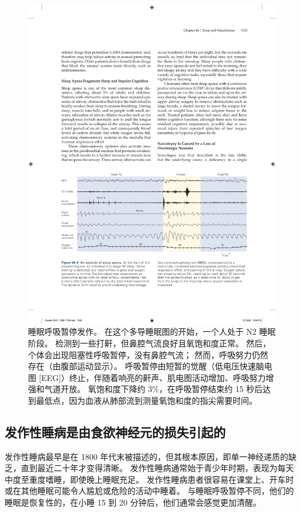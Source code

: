 \begin{figure}[htbp]
	\centering
	\includegraphics[width=0.85\linewidth]{chap44/fig_44_8}
	\caption{睡眠呼吸暂停发作。 在这个多导睡眠图的开始，一个人处于 N2 睡眠阶段。 检测到一些打鼾，但鼻腔气流良好且氧饱和度正常。 然后，个体会出现阻塞性呼吸暂停，没有鼻腔气流； 然而，呼吸努力仍然存在（由腹部运动显示）。 呼吸暂停由短暂的觉醒（低电压快速脑电图 [EEG]）终止，伴随着响亮的鼾声、肌电图活动增加、呼吸努力增强和气道开放。 氧饱和度下降约 3\%，在呼吸暂停结束约 15 秒后达到最低点，因为血液从肺部流到测量氧饱和度的指尖需要时间。}
	\label{fig:44_8}
\end{figure}


\subsection{发作性睡病是由食欲神经元的损失引起的}

发作性睡病最早是在 1800 年代末被描述的，但其根本原因，即单一神经递质的缺乏，直到最近二十年才变得清晰。
发作性睡病通常始于青少年时期，表现为每天中度至重度嗜睡，即使晚上睡眠充足。
发作性睡病患者很容易在课堂上、开车时或在其他睡眠可能令人尴尬或危险的活动中睡着。
与睡眠呼吸暂停不同，他们的睡眠是恢复性的，在小睡 15 到 20 分钟后，他们通常会感觉更加清醒。


